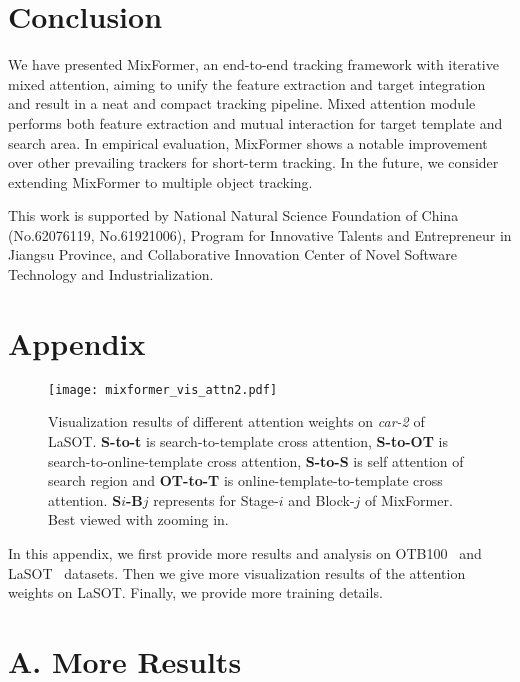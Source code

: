 \section{Conclusion}
We have presented MixFormer, an end-to-end tracking framework with iterative mixed attention, aiming to unify the feature extraction and target integration and result in a neat and compact tracking pipeline. Mixed attention module performs both feature extraction and mutual interaction for target template and search area. In empirical evaluation, MixFormer shows a notable improvement over other prevailing trackers for short-term tracking. In the future, we consider extending MixFormer to multiple object tracking.

\vspace{1mm}
\small {} This work is supported by National Natural Science Foundation of China  (No.62076119, No.61921006),  Program for Innovative Talents and Entrepreneur in Jiangsu Province, and Collaborative Innovation Center of Novel Software Technology and Industrialization.

\section*{Appendix}

\begin{figure*}[pt]
\centering
\texttt{[image: mixformer\_vis\_attn2.pdf]}
\vspace{-3mm}
\caption{Visualization results of different attention weights on \textit{car-2} of LaSOT. \textbf{S-to-t} is search-to-template cross attention, \textbf{S-to-OT} is search-to-online-template cross attention, \textbf{S-to-S} is self attention of search region and \textbf{OT-to-T} is online-template-to-template cross attention. \textbf{S$i$-B$j$} represents for Stage-$i$ and Block-$j$ of MixFormer. Best viewed with zooming in.}
\vspace{-5mm}
\label{fig:vis_attn_car-2}
\end{figure*}

In this appendix, we first provide more results and analysis on OTB100~\cite{otb} and LaSOT~\cite{lasot} datasets. Then we give more visualization results of the attention weights on LaSOT. Finally, we provide more training details.

\section*{A. More Results}

